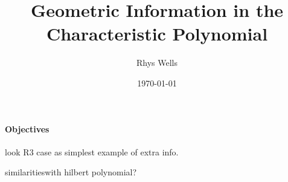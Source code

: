 \documentclass[a4paper,12pt]{article}
\title{Geometric Information in the Characteristic Polynomial}
\author{Rhys Wells}
\date{\today}
\newcounter{example}[]
\theoremstyle{definition}
\theoremstyle{indented}
\newenvironment{titlemize}[1]{%
  \paragraph{#1}
  \begin{itemize}}
  {\end{itemize}}
\begin{document}
\maketitle

\begin{titlemize} {Objectives}


look R3 case as simplest example of extra info. 

similaritieswith hilbert polynomial? 

\cite{harris2006moduli} \cite{Ehrenborg2008AffineArrangements}

\end{titlemize}



\printindex



\end{document}
